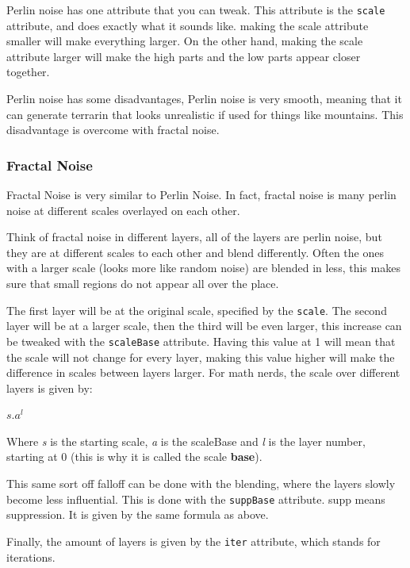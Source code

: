 \documentclass{book}
\begin{document}
Perlin noise has one attribute that you can tweak. This attribute is the \texttt{scale} attribute, and does exactly what it sounds like. making the scale attribute smaller will make everything larger. On the other hand, making the scale attribute larger will make the high parts and the low parts appear closer together.

Perlin noise has some disadvantages, Perlin noise is very smooth, meaning that it can generate terrarin that looks unrealistic if used for things like mountains. This disadvantage is overcome with fractal noise.

\subsubsection{Fractal Noise}
Fractal Noise is very similar to Perlin Noise. In fact, fractal noise is many perlin noise at different scales overlayed on each other.

Think of fractal noise in different layers, all of the layers are perlin noise, but they are at different scales to each other and blend differently. Often the ones with a larger scale (looks more like random noise) are blended in less, this makes sure that small regions do not appear all over the place.

The first layer will be at the original scale, specified by the \texttt{scale}. The second layer will be at a larger scale, then the third will be even larger, this increase can be tweaked with the \texttt{scaleBase} attribute. Having this value at 1 will mean that the scale will not change for every layer, making this value higher will make the difference in scales between layers larger. For math nerds, the scale over different layers is given by:

\begin{center}
	\begin{math}
		s.a^{l}
	\end{math}
\end{center}

Where \textit{s} is the starting scale, \textit{a} is the scaleBase and \textit{l} is the layer number, starting at 0 (this is why it is called the scale \textbf{base}).

This same sort off falloff can be done with the blending, where the layers slowly become less influential. This is done with the \texttt{suppBase} attribute. supp means suppression. It is given by the same formula as above.

Finally, the amount of layers is given by the \texttt{iter} attribute, which stands for iterations.
\end{document}
